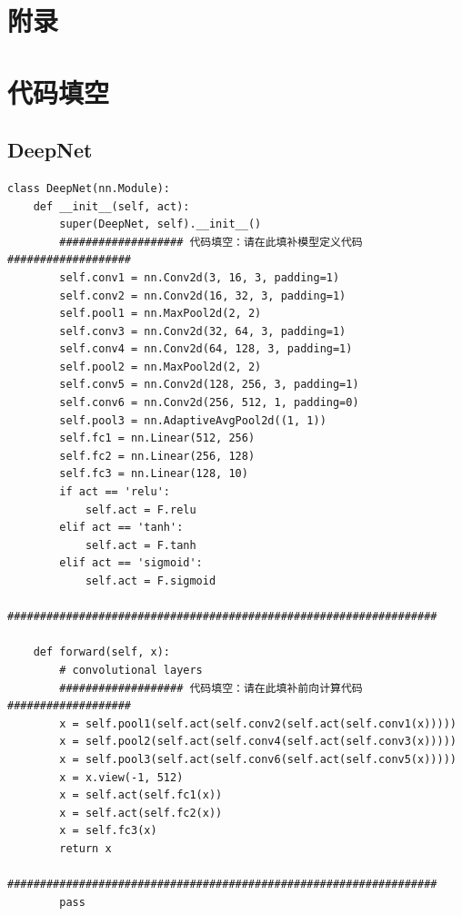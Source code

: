 \documentclass{article}%
\begin{document}
\newpage
\begin{appendices}
\section*{附录}
\section{代码填空}
\subsection*{DeepNet}
\begin{lstlisting}
class DeepNet(nn.Module):
    def __init__(self, act):
        super(DeepNet, self).__init__()
        ################### 代码填空：请在此填补模型定义代码 ###################
        self.conv1 = nn.Conv2d(3, 16, 3, padding=1)
        self.conv2 = nn.Conv2d(16, 32, 3, padding=1)
        self.pool1 = nn.MaxPool2d(2, 2)
        self.conv3 = nn.Conv2d(32, 64, 3, padding=1)
        self.conv4 = nn.Conv2d(64, 128, 3, padding=1)
        self.pool2 = nn.MaxPool2d(2, 2)
        self.conv5 = nn.Conv2d(128, 256, 3, padding=1)
        self.conv6 = nn.Conv2d(256, 512, 1, padding=0)
        self.pool3 = nn.AdaptiveAvgPool2d((1, 1))
        self.fc1 = nn.Linear(512, 256)
        self.fc2 = nn.Linear(256, 128)
        self.fc3 = nn.Linear(128, 10)
        if act == 'relu':
            self.act = F.relu
        elif act == 'tanh':
            self.act = F.tanh
        elif act == 'sigmoid':
            self.act = F.sigmoid
        ##################################################################

    def forward(self, x):
        # convolutional layers
        ################### 代码填空：请在此填补前向计算代码 ###################
        x = self.pool1(self.act(self.conv2(self.act(self.conv1(x)))))
        x = self.pool2(self.act(self.conv4(self.act(self.conv3(x)))))
        x = self.pool3(self.act(self.conv6(self.act(self.conv5(x)))))
        x = x.view(-1, 512)
        x = self.act(self.fc1(x))
        x = self.act(self.fc2(x))
        x = self.fc3(x)
        return x
        ##################################################################
        pass
\end{lstlisting}

\end{appendices}
\end{document}
